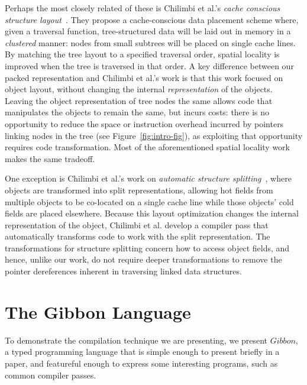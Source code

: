 \documentclass[a4paper,english]{lipics-v2016}
\newcommand{\treelang}{Gibbon\xspace} %
\begin{document}
Perhaps the most closely related of these is Chilimbi et al.'s {\em cache
conscious structure layout}~\cite{Chilimbi1999}. They propose a
cache-conscious data placement scheme where, given a traversal function,
tree-structured data will be laid out in memory in a {\em clustered} manner:
nodes from small subtrees will be placed on single cache lines. By matching
the tree layout to a specified traversal order, spatial locality is improved
when the tree is traversed in that order. A key difference between our packed
representation and Chilimbi et al.'s work is that this work focused on object
layout, without changing the internal {\em representation} of the objects.
Leaving the object representation of tree nodes the same allows code that
manipulates the objects to remain the same, but incurs costs: there is no
opportunity to reduce the space or instruction overhead incurred by pointers
linking nodes in the tree (see Figure~\ref{fig:intro-fig}), as exploiting that
opportunity requires code transformation. Most of the aforementioned spatial
locality work makes the same tradeoff.

One exception is Chilimbi et al.'s work on {\em automatic structure
splitting}~\cite{Chilimbi1999b}, where objects are transformed into split
representations, allowing hot fields from multiple objects to be co-located on
a single cache line while those objects' cold fields are placed elsewhere.
Because this layout optimization changes the internal representation of the
object, Chilimbi et al. develop a compiler pass that automatically transforms
code to work with the split representation. The transformations for structure
splitting concern how to access object fields, and hence, unlike our work, do
not require deeper transformations to remove the pointer dereferences inherent
in traversing linked data structures.


\section{The \treelang{} Language}


To demonstrate the compilation technique we are presenting, we present
$\treelang{}$, a typed programming language that is simple enough to
present briefly in a paper, and featureful enough to express some
interesting programs, such as common compiler passes.
\end{document}
